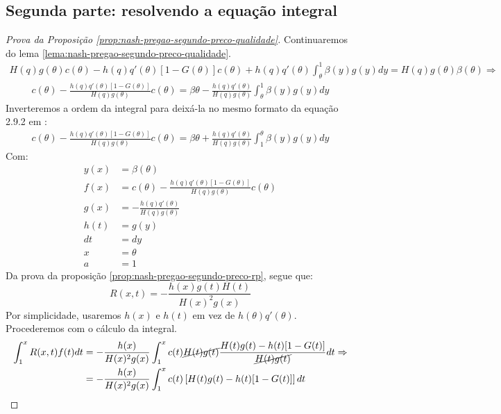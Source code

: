 \subsection{Segunda parte: resolvendo a equação integral}
\begin{proof}[Prova da Proposição \ref{prop:nash-pregao-segundo-preco-qualidade}]
	Continuaremos do lema \ref{lema:nash-pregao-segundo-preco-qualidade}.
	\begin{align*}
		H(q)g(\theta)c(\theta)-h(q)q'(\theta)[1-G(\theta)]c(\theta) + h(q)q'(\theta) \int_{\theta}^1 \beta(y)g(y)dy = H(q)g(\theta)\beta(\theta) \Rightarrow
	\end{align*}
	\begin{align*}
		c(\theta)-\frac{h(q)q'(\theta)[1-G(\theta)]}{H(q)g(\theta)}c(\theta) = \beta{\theta} - \frac{h(q)q'(\theta)}{H(q)g(\theta)} \int_{\theta}^1 \beta(y)g(y)dy 
	\end{align*}
	Inverteremos a ordem da integral para deixá-la no mesmo formato da equação 2.9.2 em \citet{polyanin1998handbook}:
	\begin{align*}
		c(\theta)-\frac{h(q)q'(\theta)[1-G(\theta)]}{H(q)g(\theta)}c(\theta) = \beta{\theta} + \frac{h(q)q'(\theta)}{H(q)g(\theta)} \int_1^{\theta} \beta(y)g(y)dy 
	\end{align*}
	Com:
	\begin{align*}
		y(x) & = \beta(\theta) \\
		f(x) & = c(\theta)-\frac{h(q)q'(\theta)[1-G(\theta)]}{H(q)g(\theta)}c(\theta) \\
		g(x) & = - \frac{h(q)q'(\theta)}{H(q)g(\theta)} \\
		h(t) & = g(y) \\
		dt & = dy \\
		x & = \theta \\
		a & = 1
	\end{align*}
	Da prova da proposição \ref{prop:nash-pregao-segundo-preco-rp}, segue que:
	\begin{equation*}
		R(x,t) = -\frac{h(x)g(t)H(t)}{H(x)^2g(x)}
	\end{equation*}
	Por simplicidade, usaremos $h(x)$ e $h(t)$ em vez de $h(\theta)q'(\theta)$. Procederemos com o cálculo da integral.
	\begin{align*}
		\int_1^x R(x,t)f(t)dt & = -\frac{h(x)}{H(x)^2g(x)} \int_1^x c(t)\cancel{H(t)g(t)} \frac{H(t)g(t)-h(t)[1-G(t)]}{\cancel{H(t)g(t)}} dt \Rightarrow \\
		& = -\frac{h(x)}{H(x)^2g(x)} \int_1^x  c(t) \left[ H(t)g(t)-h(t)[1-G(t)] \right] dt
	\end{align*}

\end{proof}
